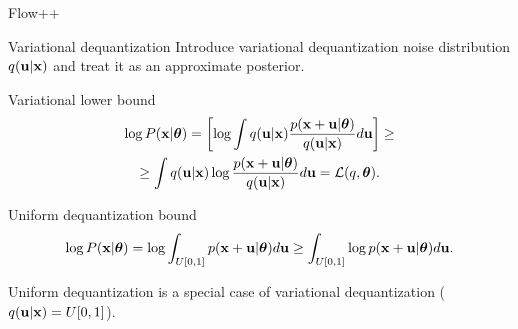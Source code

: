 \begin{frame}{Flow++}
	\vspace{-0.3cm}
	\begin{block}{Variational dequantization}
		Introduce variational dequantization noise distribution $q(\mathbf{u} | \mathbf{x})$ and treat it as an approximate posterior. 
	\end{block}
	\vspace{-0.3cm}
	\begin{block}{Variational lower bound}
		\vspace{-0.7cm}
		\begin{multline*}
			\log P(\mathbf{x} | \boldsymbol{\theta}) = \left[ \log \int q(\mathbf{u} | \mathbf{x}) \frac{p(\mathbf{x} + \mathbf{u} | \boldsymbol{\theta})}{q(\mathbf{u} | \mathbf{x})} d \mathbf{u} \right] \geq \\ 
			\geq  \int q(\mathbf{u} | \mathbf{x}) \log \frac{p(\mathbf{x} + \mathbf{u} | \boldsymbol{\theta})}{q(\mathbf{u} | \mathbf{x})} d \mathbf{u} = \mathcal{L}(q, \boldsymbol{\theta}).
		\end{multline*}
	\end{block}
	\vspace{-0.6cm}
	\begin{block}{Uniform dequantization bound}
		\vspace{-0.6cm}
		\[
		\log P(\mathbf{x} | \boldsymbol{\theta}) = \log \int_{U[0, 1]} p(\mathbf{x} + \mathbf{u} | \boldsymbol{\theta}) d \mathbf{u} \geq \int_{U[0, 1]} \log p(\mathbf{x} + \mathbf{u} | \boldsymbol{\theta}) d \mathbf{u}.
		\]
		\vspace{-0.4cm}
	\end{block}
	Uniform dequantization is a special case of variational dequantization ($q(\mathbf{u} | \mathbf{x}) = U[0, 1]$).
\end{frame}

